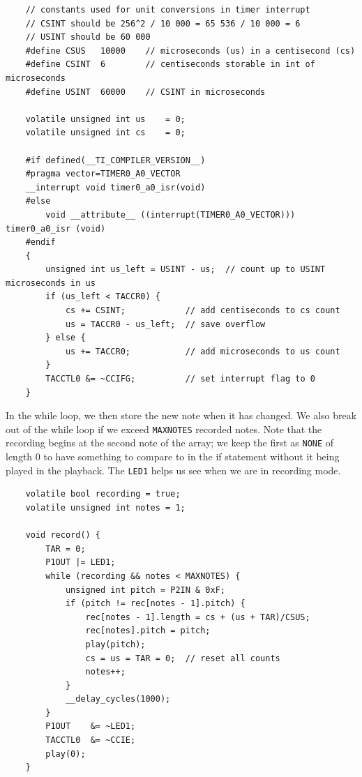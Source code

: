 \documentclass[letterpaper]{report}
\begin{document}
				\begin{verbatim}
    // constants used for unit conversions in timer interrupt
    // CSINT should be 256^2 / 10 000 = 65 536 / 10 000 = 6
    // USINT should be 60 000
    #define CSUS   10000    // microseconds (us) in a centisecond (cs)
    #define CSINT  6        // centiseconds storable in int of microseconds
    #define USINT  60000    // CSINT in microseconds
    
    volatile unsigned int us    = 0;
    volatile unsigned int cs    = 0;
    
    #if defined(__TI_COMPILER_VERSION__)
    #pragma vector=TIMER0_A0_VECTOR
    __interrupt void timer0_a0_isr(void)
    #else
        void __attribute__ ((interrupt(TIMER0_A0_VECTOR))) timer0_a0_isr (void)
    #endif
    {
        unsigned int us_left = USINT - us;  // count up to USINT microseconds in us
        if (us_left < TACCR0) {
            cs += CSINT;            // add centiseconds to cs count
            us = TACCR0 - us_left;  // save overflow
        } else {
            us += TACCR0;           // add microseconds to us count
        }
        TACCTL0 &= ~CCIFG;          // set interrupt flag to 0
    }
				\end{verbatim}
			In the while loop, we then store the new note when it has changed. We also break out of the while loop if we exceed \texttt{MAXNOTES} recorded notes. Note that the recording begins at the second note of the array; we keep the first as \texttt{NONE} of length 0 to have something to compare to in the if statement without it being played in the playback. The \texttt{LED1} helps us see when we are in recording mode.
				\begin{verbatim}
    volatile bool recording = true;
    volatile unsigned int notes = 1;
    
    void record() {
        TAR = 0;
        P1OUT |= LED1;
        while (recording && notes < MAXNOTES) {
            unsigned int pitch = P2IN & 0xF;
            if (pitch != rec[notes - 1].pitch) {
                rec[notes - 1].length = cs + (us + TAR)/CSUS;
                rec[notes].pitch = pitch;
                play(pitch);
                cs = us = TAR = 0;  // reset all counts
                notes++;
            }
            __delay_cycles(1000);
        }
        P1OUT    &= ~LED1;
        TACCTL0  &= ~CCIE;
        play(0);
    }
				\end{verbatim}
\end{document}
